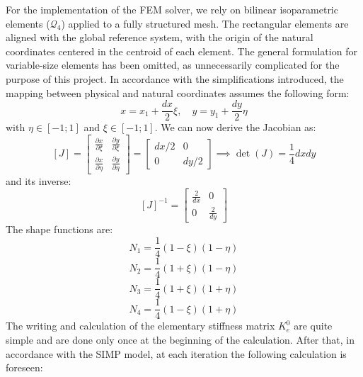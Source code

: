 \documentclass{article}
\begin{document}
\noindent For the implementation of the FEM solver, we rely on bilinear isoparametric elements ($\mathcal{Q}_4$) applied to a fully structured mesh. The rectangular elements are aligned with the global reference system, with the origin of the natural coordinates centered in the centroid of each element. The general formulation for variable-size elements has been omitted, as unnecessarily complicated for the purpose of this project. In accordance with the simplifications introduced, the mapping between physical and natural coordinates assumes the following form:
\begin{equation}\label{eq:mapping}
x = x_1 + \frac{dx}{2}\xi, \quad y = y_1 + \frac{dy}{2}\eta
\end{equation}
\noindent with $\eta \in [-1; 1]$ and $\xi \in [-1; 1]$. We can now derive the Jacobian as:
\begin{equation}\label{eq:jacobian}
[J] = \begin{bmatrix} \frac{\partial x}{\partial \xi} & \frac{\partial y}{\partial \xi} \\ \frac{\partial x}{\partial \eta} & \frac{\partial y}{\partial \eta} \end{bmatrix} = \begin{bmatrix} dx/2 & 0 \\ 0 & dy/2 \end{bmatrix} \implies \det(J) = \frac{1}{4}dxdy
\end{equation}
\noindent and its inverse:
\begin{equation}\label{eq:inv_jacobian}
[J]^{-1} = \begin{bmatrix} \frac{2}{dx} & 0 \\ 0 & \frac{2}{dy} \end{bmatrix}
\end{equation}
\noindent The shape functions are:
\begin{equation}\label{eq:n1}
N_1 = \frac{1}{4}(1 - \xi)(1 - \eta)
\end{equation}
\begin{equation}\label{eq:n2}
N_2 = \frac{1}{4}(1 + \xi)(1 - \eta)
\end{equation}
\begin{equation}\label{eq:n3}
N_3 = \frac{1}{4}(1 + \xi)(1 + \eta)
\end{equation}
\begin{equation}\label{eq:n4}
N_4 = \frac{1}{4}(1 - \xi)(1 + \eta)
\end{equation}
\noindent The writing and calculation of the elementary stiffness matrix $K_e^0$ are quite simple and are done only once at the beginning of the calculation. After that, in accordance with the SIMP model, at each iteration the following calculation is foreseen:
\end{document}
